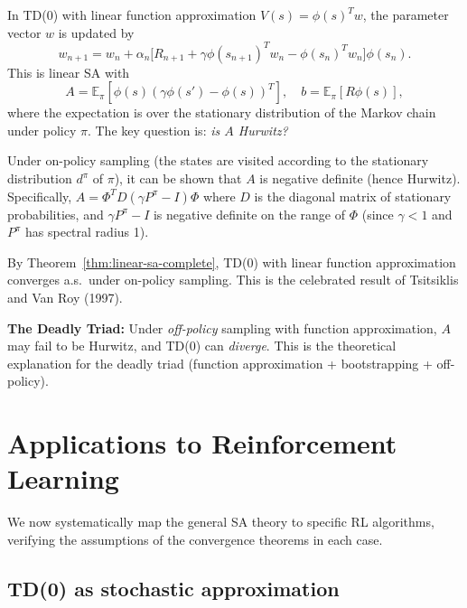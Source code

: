 \documentclass[11pt,a4paper]{article}
\theoremstyle{definition}
\theoremstyle{plain}
\theoremstyle{remark}
\newcommand{\E}{\mathbb{E}}
\begin{document}
\begin{rlconnection}
In TD(0) with linear function approximation $V(s) = \phi(s)^T w$, the parameter
vector $w$ is updated by
\[
  w_{n+1} = w_n + \alpha_n \bigl[R_{n+1} + \gamma \phi(s_{n+1})^T w_n
    - \phi(s_n)^T w_n\bigr] \phi(s_n).
\]
This is linear SA with
\[
  A = \E_\pi[\phi(s)(\gamma \phi(s') - \phi(s))^T], \quad
  b = \E_\pi[R \phi(s)],
\]
where the expectation is over the stationary distribution of the Markov chain
under policy $\pi$. The key question is: \emph{is $A$ Hurwitz?}

Under on-policy sampling (the states are visited according to the stationary
distribution $d^\pi$ of $\pi$), it can be shown that $A$ is negative definite
(hence Hurwitz). Specifically, $A = \Phi^T D(\gamma P^\pi - I)\Phi$ where $D$ is
the diagonal matrix of stationary probabilities, and $\gamma P^\pi - I$ is negative
definite on the range of $\Phi$ (since $\gamma < 1$ and $P^\pi$ has spectral
radius 1).

By Theorem~\ref{thm:linear-sa-complete}, TD(0) with linear function approximation
converges a.s.\ under on-policy sampling. This is the celebrated result of Tsitsiklis
and Van Roy (1997).

\textbf{The Deadly Triad:} Under \emph{off-policy} sampling with function
approximation, $A$ may fail to be Hurwitz, and TD(0) can \emph{diverge}. This is
the theoretical explanation for the deadly triad (function approximation +
bootstrapping + off-policy).
\end{rlconnection}


\section{Applications to Reinforcement Learning}
\label{sec:rl-applications}

We now systematically map the general SA theory to specific RL algorithms, verifying
the assumptions of the convergence theorems in each case.

\subsection{TD(0) as stochastic approximation}
\end{document}
